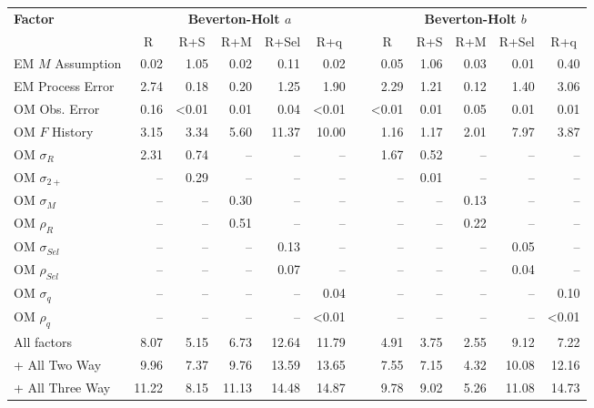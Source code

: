 \begin{center}
\begin{tabular}{lrrrrrcrrrrr}
\hline\hline
\multicolumn{1}{l}{\bfseries Factor}&\multicolumn{5}{c}{\bfseries Beverton-Holt $a$}&\multicolumn{1}{c}{\bfseries }&\multicolumn{5}{c}{\bfseries Beverton-Holt $b$}\tabularnewline
\cline{2-6} \cline{8-12}
\multicolumn{1}{l}{}&\multicolumn{1}{c}{R}&\multicolumn{1}{c}{R+S}&\multicolumn{1}{c}{R+M}&\multicolumn{1}{c}{R+Sel}&\multicolumn{1}{c}{R+q}&\multicolumn{1}{c}{}&\multicolumn{1}{c}{R}&\multicolumn{1}{c}{R+S}&\multicolumn{1}{c}{R+M}&\multicolumn{1}{c}{R+Sel}&\multicolumn{1}{c}{R+q}\tabularnewline
\hline
EM $M$ Assumption& 0.02& 1.05& 0.02& 0.11& 0.02&& 0.05& 1.06& 0.03& 0.01& 0.40\tabularnewline
EM Process Error& 2.74& 0.18& 0.20& 1.25& 1.90&& 2.29& 1.21& 0.12& 1.40& 3.06\tabularnewline
OM Obs. Error& 0.16&\textless  0.01& 0.01& 0.04&\textless  0.01&&\textless  0.01& 0.01& 0.05& 0.01& 0.01\tabularnewline
OM $F$ History& 3.15& 3.34& 5.60&11.37&10.00&& 1.16& 1.17& 2.01& 7.97& 3.87\tabularnewline
OM $\sigma_R$& 2.31& 0.74&--&--&--&& 1.67& 0.52&--&--&--\tabularnewline
OM $\sigma_{2+}$ &--& 0.29&--&--&--&&--& 0.01&--&--&--\tabularnewline
OM $\sigma_M$&--&--& 0.30&--&--&&--&--& 0.13&--&--\tabularnewline
OM $\rho_R$&--&--& 0.51&--&--&&--&--& 0.22&--&--\tabularnewline
OM $\sigma_{Sel}$&--&--&--& 0.13&--&&--&--&--& 0.05&--\tabularnewline
OM $\rho_{Sel}$&--&--&--& 0.07&--&&--&--&--& 0.04&--\tabularnewline
OM $\sigma_q$&--&--&--&--& 0.04&&--&--&--&--& 0.10\tabularnewline
OM $\rho_q$&--&--&--&--&\textless  0.01&&--&--&--&--&\textless  0.01\tabularnewline
All factors& 8.07& 5.15& 6.73&12.64&11.79&& 4.91& 3.75& 2.55& 9.12& 7.22\tabularnewline
+ All Two Way& 9.96& 7.37& 9.76&13.59&13.65&& 7.55& 7.15& 4.32&10.08&12.16\tabularnewline
+ All Three Way&11.22& 8.15&11.13&14.48&14.87&& 9.78& 9.02& 5.26&11.08&14.73\tabularnewline
\hline
\end{tabular}\end{center}
